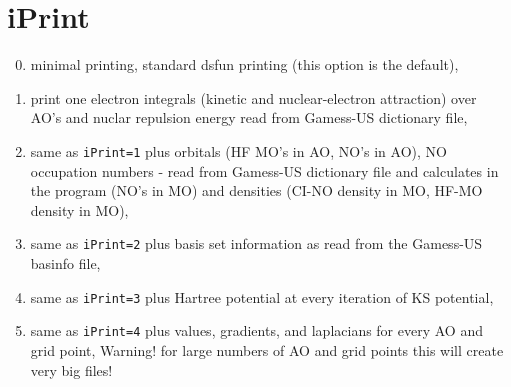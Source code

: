 \documentclass[10pt]{article}
\begin{document}
\section{iPrint}
\begin{enumerate}[1 - ]
    \setcounter{enumi}{-1}
    \item minimal printing, standard dsfun printing (this option is the default),
    \item print one electron integrals (kinetic and nuclear-electron attraction) over AO's and nuclar repulsion energy 
    read from Gamess-US dictionary file,
    \item same as \verb!iPrint=1! plus orbitals (HF MO's in AO, NO's in AO), NO occupation numbers - 
    read from Gamess-US dictionary file and calculates in the program (NO's in MO) and densities 
    (CI-NO density in MO, HF-MO density in MO),
    \item same as \verb!iPrint=2! plus basis set information as read from the Gamess-US basinfo file,
    \item same as \verb!iPrint=3! plus Hartree potential at every iteration of KS potential,
    \item same as \verb!iPrint=4! plus values, gradients, and laplacians for every AO and grid point,
    {\color{red}Warning!} for large numbers of AO and grid points this will create very big files!
\end{enumerate}




\end{document}
